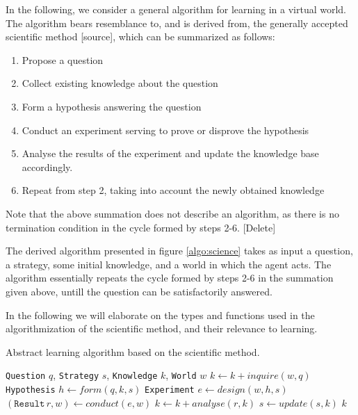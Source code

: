 \documentclass[../Master.tex]{subfiles}
\begin{document}
In the following, we consider a general algorithm for learning in a virtual world. The algorithm bears resemblance to, and is derived from, the generally accepted scientific method [source], which can be summarized as follows:

\begin{enumerate}
    \item Propose a question
    \item Collect existing knowledge about the question
    \item Form a hypothesis answering the question
    \item Conduct an experiment serving to prove or disprove the hypothesis
    \item Analyse the results of the experiment and update the knowledge base accordingly.
    \item Repeat from step 2, taking into account the newly obtained knowledge
\end{enumerate}

Note that the above summation does not describe an algorithm, as there is no termination condition in the cycle formed by steps 2-6. [Delete]

The derived algorithm presented in figure \ref{algo:science} takes as input a question, a strategy, some initial knowledge, and a world in which the agent acts. The algorithm essentially repeats the cycle formed by steps 2-6 in the summation given above, untill the question can be satisfactorily answered.

In the following we will elaborate on the types and functions used in the algorithmization of the scientific method, and their relevance to learning.

\begin{algorithm}
    \caption{Abstract learning algorithm based on the scientific method.}
    \label{algo:science}

    \begin{algorithmic}
         {\texttt{Question} $q$, \texttt{Strategy} $s$, \texttt{Knowledge} $k$, \texttt{World} $w$}
                \State $k \gets k + inquire(w, q)$
                \State \texttt{Hypothesis} $h \gets form(q, k, s)$
                \State \texttt{Experiment} $e \gets design(w, h, s)$
                \State $(\texttt{Result} \, r, w) \gets conduct(e, w)$
                \State $k \gets k + analyse(r, k)$
                \State $s \gets update(s, k)$
            \EndWhile
            \State \Return $k$
        \EndFunction
    \end{algorithmic}
\end{algorithm}
\end{document}
